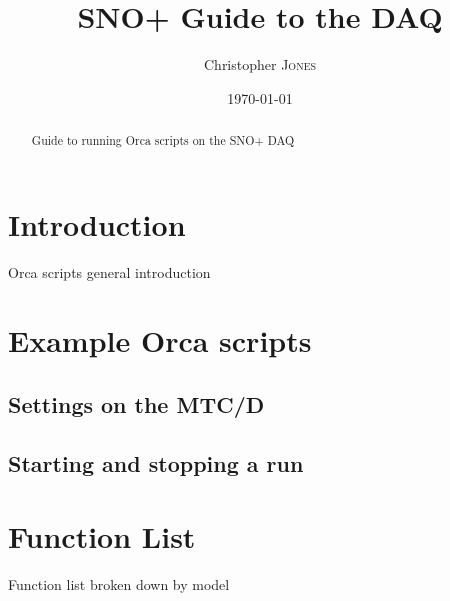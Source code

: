 \documentclass[12pt,preprint]{article}
\title{SNO+ Guide to the DAQ} %
\author{Christopher \textsc{Jones}} %
\date{\today} %
\begin{document}
\maketitle %

\begin{abstract}
\noindent
Guide to running Orca scripts on the SNO+ DAQ 
\end{abstract}

\section{Introduction}\normalsize
Orca scripts general introduction

\section{Example Orca scripts}
\subsection{Settings on the MTC/D}
\subsection{Starting and stopping a run}

\section{Function List}
Function list broken down by model 









%

%

\end{document}
